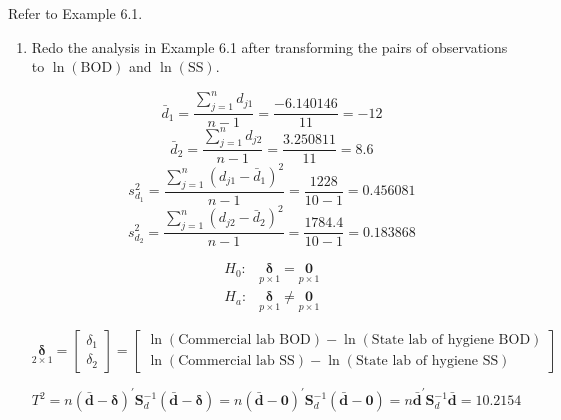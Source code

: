 Refer to Example 6.1.
\begin{enumerate}[label= (\alph*)]
    \item Redo the analysis in Example 6.1 after transforming the pairs of observations to $\ln(\text{BOD})$ and $\ln(\text{SS})$.

    \[
        \bar{d}_{1}
        =
        \frac{ \sum_{j=1}^{n}{ d_{j1} } }{n-1}
        =
        \frac{-6.140146}{11}
        =
        -12
    \]
    \[
        \bar{d}_{2}
        =
        \frac{ \sum_{j=1}^{n}{ d_{j2} } }{n-1}
        =
        \frac{3.250811}{11}
        =
        8.6
    \]
    \[
        s_{d_{1}}^{2}
        =
        \frac{ \sum_{j=1}^{n}{( d_{j1} - \bar{d}_{1} )}^{2} }{n-1}
        =
        \frac{1228}{10 - 1}
        =
        0.456081
    \]
    \[
        s_{d_{2}}^{2}
        =
        \frac{ \sum_{j=1}^{n}{( d_{j2} - \bar{d}_{2} )}^{2} }{n-1}
        =
        \frac{1784.4}{10 - 1}
        =
        0.183868
    \]

    \begin{align*}
        H_{0}: & \underset{p \times 1}{\bm{\delta}} = \underset{p \times 1}{\textbf{0}} \\
        H_{a}: & \underset{p \times 1}{\bm{\delta}} \ne \underset{p \times 1}{\textbf{0}}
    \end{align*}

    \[
        \underset{2 \times 1}{\bm{\delta}}
        =
        \left[
            \begin{array}{c}
                \delta_{1} \\
                \delta_{2}
            \end{array}
        \right]
        =
        \left[
            \begin{array}{c}
                {\scriptstyle \ln \left( \text{Commercial lab BOD} \right) - \ln \left( \text{State lab of hygiene BOD} \right)} \\
                {\scriptstyle
                \ln \left( \text{Commercial lab SS} \right) - \ln \left( \text{State lab of hygiene SS} \right)}
            \end{array}
        \right]
    \]

    \[
        T^{2}
        =
        n
        {(\bar{\textbf{d}} - \bm{\delta})}^{\prime}
        \textbf{S}_{d}^{-1}
        (\bar{\textbf{d}} - \bm{\delta})
        =
        n
        {(\bar{\textbf{d}} - \textbf{0})}^{\prime}
        \textbf{S}_{d}^{-1}
        (\bar{\textbf{d}} - \textbf{0})
        =
        n
        {\bar{\textbf{d}}}^{\prime}
        \textbf{S}_{d}^{-1}
        \bar{\textbf{d}}
        =
        10.2154
    \]


\end{enumerate}
